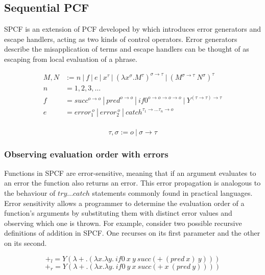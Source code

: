 \documentclass[12pt,a4paper]{report}
\theoremstyle{definition}
\theoremstyle{remark}
\begin{document}
\subsection{Sequential PCF}\label{sec:spcf}
SPCF is an extension of PCF developed by \cite{cartwright_1992} which introduces error generators and escape handlers, acting as two kinds of control operators. Error generators describe the misapplication of terms and escape handlers can be thought of as escaping from local evaluation of a phrase.

\begin{equation} \label{eq:spcf_grammar}
\begin{split}
    M,N &:= n\ |\ f\ |\ e\ |\ x^{\tau}\ |\ (\lambda x^{\sigma} .M^{\tau})^{\sigma \rightarrow \tau}\ |\ (M^{\sigma \rightarrow \tau} \ N^{\sigma})^{\tau}\\
    n &= 1, 2, 3, \dots\\
    f &= succ^{o \rightarrow o} \ | \ pred^{o \rightarrow o} \ | \ if0^{o \rightarrow o \rightarrow o \rightarrow o} \ | \ Y^{(\tau \rightarrow \tau) \rightarrow \tau}\\
    e &= error_1^{\ o}\ |\ error_{2}^{\ o}\ |\ catch^{\tau_1 \rightarrow \dots \tau_n \rightarrow o}\\
\end{split}
\end{equation}

\begin{equation}
    \tau , \sigma := o\ |\ \sigma \rightarrow \tau
\end{equation}

\subsubsection{Observing evaluation order with errors}\label{section: observing sequentiality}
Functions in SPCF are error-sensitive, meaning that if an argument evaluates to an error the function also returns an error. This error propagation is analogous to the behaviour of $try...catch$ statements commonly found in practical languages. Error sensitivity allows a programmer to determine the evaluation order of a function's arguments by substituting them with distinct error values and observing which one is thrown. For example, consider two possible recursive definitions of addition in SPCF. One recurses on its first parameter and the other on its second.

\[+_l = Y(\lambda+.(\lambda x.\lambda y.\ if0\ x\ y\ succ (+\ (pred\ x)\ y)))\]
\[+_r = Y(\lambda+.(\lambda x.\lambda y.\ if0\ y\ x\ succ (+\ x\ (pred\ y))))\]
\end{document}
